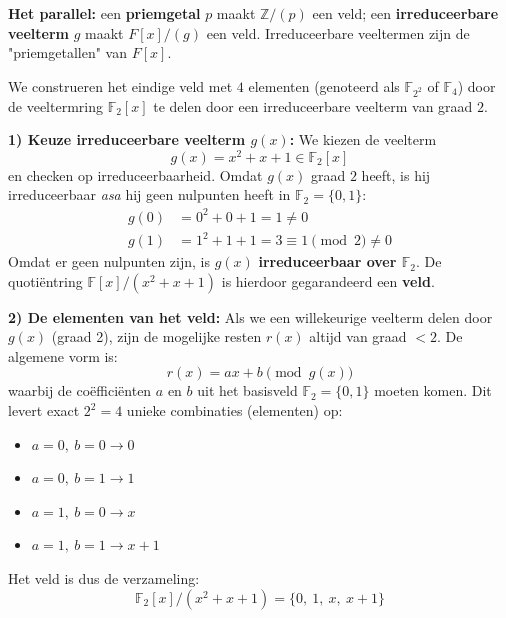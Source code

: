\begin{barbox}[WildStrawberry][gray!3]
    \textcolor{WildStrawberry}{\textbf{Het parallel:}} een \textbf{priemgetal} $p$ maakt $\mathbb{Z}/(p)$ een veld; een \textbf{irreduceerbare veelterm} $g$ maakt $F[x]/(g)$ een veld. Irreduceerbare veeltermen zijn de "priemgetallen" van $F[x]$. 
\end{barbox}

\textbf{} We construeren het eindige veld met $4$ elementen (genoteerd als $\mathbb{F}_{2^2}$ of $\mathbb{F}_4$) door de veeltermring $\mathbb{F}_2[x]$ te delen door een irreduceerbare veelterm van graad $2$.

\textbf{1) Keuze irreduceerbare veelterm $g(x)$:} We kiezen de veelterm
\begin{equation*}
    g(x) = x^2 + x + 1 \in \mathbb{F}_2[x]
\end{equation*}
en checken op irreduceerbaarheid. Omdat $g(x)$ graad $2$ heeft, is hij irreduceerbaar \emph{asa} hij geen nulpunten heeft in $\mathbb{F}_2 = \{0,1\}$:
\begin{equation*}
    \begin{aligned}
        g(0) &= 0^2 + 0 + 1 = 1 \neq 0 \\
        g(1) &= 1^2 + 1 + 1 = 3 \equiv 1 \pmod 2 \neq 0
    \end{aligned}
\end{equation*}
Omdat er geen nulpunten zijn, is $g(x)$ \textbf{irreduceerbaar over $\mathbb{F}_2$}. De quotiëntring $\mathbb{F}[x]/(x^2 + x + 1)$ is hierdoor gegarandeerd een \textbf{veld}.

\textbf{2) De elementen van het veld:} Als we een willekeurige veelterm delen door $g(x)$ (graad 2), zijn de mogelijke resten $r(x)$ altijd van graad $< 2$. De algemene vorm is: 
\begin{equation*}
    r(x) = ax + b \pmod{g(x)}
\end{equation*}
waarbij de coëfficiënten $a$ en $b$ uit het basisveld $\mathbb{F}_2 = \{0,1\}$ moeten komen. Dit levert exact $2^2=4$ unieke combinaties (elementen) op:
\begin{itemize}
    \item $a=0,\ b=0 \to 0$
    \item $a=0,\ b=1 \to 1$
    \item $a=1,\ b=0 \to x$
    \item $a=1,\ b=1 \to x+1$
\end{itemize}
Het veld is dus de verzameling:
\begin{equation*}
    \mathbb{F}_2[x]/(x^2+x+1) = \{0,\ 1,\ x,\ x+1\}
\end{equation*}

